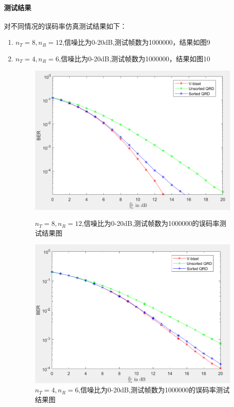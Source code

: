 \documentclass[a4paper,12pt]{article}
\begin{document}
	\paragraph{测试结果}
	对不同情况的误码率仿真测试结果如下：
	\begin{enumerate}
		\item $n_T=8,n_R=12$,信噪比为0-20dB,测试帧数为1000000，结果如图9
		\item $n_T=4,n_R=6$,信噪比为0-20dB,测试帧数为1000000，结果如图10
		\begin{figure}[h]
			\centering
			\begin{minipage}{0.4\textwidth}
				\centering
				\includegraphics[width=\textwidth]{9.png}
				\caption{$n_T=8,n_R=12$,信噪比为0-20dB,测试帧数为1000000的误码率测试结果图}
			\end{minipage}
			\qquad
			\begin{minipage}{0.4\textwidth}
				\centering
				\includegraphics[width=\textwidth]{10.png}
				\caption{$n_T=4,n_R=6$,信噪比为0-20dB,测试帧数为1000000的误码率测试结果图}
			\end{minipage}
		\end{figure}
	\end{enumerate}
	\newpage
\end{document}
